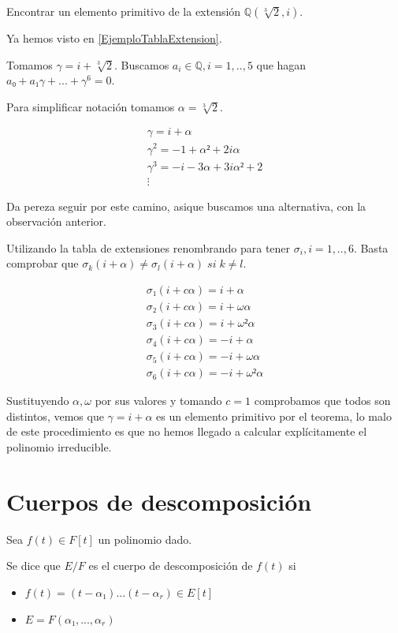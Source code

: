 \documentclass{apuntes}
\begin{document}
\begin{example}
Encontrar un elemento primitivo de la extensión $ℚ(\sqrt[3]{2},i)$.

Ya hemos visto en \ref{EjemploTablaExtension}.

Tomamos $γ=i+\sqrt[3]{2}$. Buscamos $a_i ∈ℚ, i=1,..,5$ que hagan $a₀  + a₁γ + ... + γ^6 = 0$.

Para simplificar notación tomamos $α = \sqrt[3]{2}$.

\begin{gather*}
γ=i+α\\γ^2=-1+α²+2iα\\γ^3=-i-3α+3iα²+2\\\vdots
\end{gather*}

Da pereza seguir por este camino, asique buscamos una alternativa, con la observación anterior.

Utilizando la tabla de extensiones renombrando para tener $σ_i, i=1,..,6$. Basta comprobar que $σ_k (i+α) ≠ σ_l(i+α)\;si\;k≠l$.

\begin{gather*}
σ₁(i+cα) = i+α\\
σ₂(i+cα) = i+ωα\\
σ_3(i+cα) = i+ω²α\\
σ_4(i+cα) = -i+α\\
σ_5(i+cα) = -i+ωα\\
σ_6(i+cα) =  -i+ω²α
\end{gather*}

Sustituyendo $α,ω$ por sus valores y tomando $c=1$ comprobamos que todos son distintos, vemos que $γ=i+α$ es un elemento primitivo por el teorema, lo malo de este procedimiento es que no hemos llegado a calcular explícitamente el polinomio irreducible.
\end{example}


\section{Cuerpos de descomposición}

\begin{defn}
Sea $f(t) ∈F[t]$ un polinomio dado.

Se dice que $E/F$ es el cuerpo de descomposición de $f(t)$ si
\begin{itemize}
\item $f(t) = (t-α₁) ... (t-α_r) ∈E[t]$
\item $E=F(α₁,...,α_r)$
\end{itemize}
\end{defn}
\end{document}
